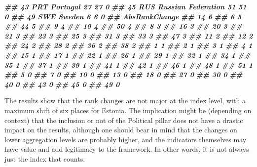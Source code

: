 \documentclass[
]{book}
\newenvironment{Shaded}{\begin{snugshade}}{\end{snugshade}}
\newcommand{\DocumentationTok}[1]{\textcolor[rgb]{0.56,0.35,0.01}{\textbf{\textit{#1}}}}
\begin{document}
\begin{Shaded}
\begin{Highlighting}[]
\DocumentationTok{\#\# 43      PRT           Portugal            27               27          0}
\DocumentationTok{\#\# 45      RUS Russian Federation            51               51          0}
\DocumentationTok{\#\# 49      SWE             Sweden             6                6          0}
\DocumentationTok{\#\#    AbsRankChange}
\DocumentationTok{\#\# 14             6}
\DocumentationTok{\#\# 6              5}
\DocumentationTok{\#\# 44             5}
\DocumentationTok{\#\# 9              4}
\DocumentationTok{\#\# 19             4}
\DocumentationTok{\#\# 50             4}
\DocumentationTok{\#\# 8              3}
\DocumentationTok{\#\# 16             3}
\DocumentationTok{\#\# 20             3}
\DocumentationTok{\#\# 21             3}
\DocumentationTok{\#\# 23             3}
\DocumentationTok{\#\# 25             3}
\DocumentationTok{\#\# 31             3}
\DocumentationTok{\#\# 33             3}
\DocumentationTok{\#\# 47             3}
\DocumentationTok{\#\# 11             2}
\DocumentationTok{\#\# 12             2}
\DocumentationTok{\#\# 24             2}
\DocumentationTok{\#\# 28             2}
\DocumentationTok{\#\# 36             2}
\DocumentationTok{\#\# 38             2}
\DocumentationTok{\#\# 1              1}
\DocumentationTok{\#\# 2              1}
\DocumentationTok{\#\# 3              1}
\DocumentationTok{\#\# 4              1}
\DocumentationTok{\#\# 15             1}
\DocumentationTok{\#\# 17             1}
\DocumentationTok{\#\# 22             1}
\DocumentationTok{\#\# 26             1}
\DocumentationTok{\#\# 29             1}
\DocumentationTok{\#\# 32             1}
\DocumentationTok{\#\# 34             1}
\DocumentationTok{\#\# 35             1}
\DocumentationTok{\#\# 37             1}
\DocumentationTok{\#\# 39             1}
\DocumentationTok{\#\# 41             1}
\DocumentationTok{\#\# 42             1}
\DocumentationTok{\#\# 46             1}
\DocumentationTok{\#\# 48             1}
\DocumentationTok{\#\# 51             1}
\DocumentationTok{\#\# 5              0}
\DocumentationTok{\#\# 7              0}
\DocumentationTok{\#\# 10             0}
\DocumentationTok{\#\# 13             0}
\DocumentationTok{\#\# 18             0}
\DocumentationTok{\#\# 27             0}
\DocumentationTok{\#\# 30             0}
\DocumentationTok{\#\# 40             0}
\DocumentationTok{\#\# 43             0}
\DocumentationTok{\#\# 45             0}
\DocumentationTok{\#\# 49             0}
\end{Highlighting}
\end{Shaded}

The results show that the rank changes are not major at the index level, with a maximum shift of six places for Estonia. The implication might be (depending on context) that the inclusion or not of the Political pillar does not have a drastic impact on the results, although one should bear in mind that the changes on lower aggregation levels are probably higher, and the indicators themselves may have value and add legitimacy to the framework. In other words, it is not always just the index that counts.
\end{document}
